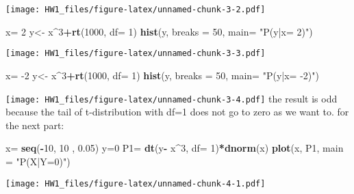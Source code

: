\documentclass[]{article}
\newenvironment{Shaded}{\begin{snugshade}}{\end{snugshade}}
\newcommand{\DataTypeTok}[1]{\textcolor[rgb]{0.13,0.29,0.53}{#1}}
\newcommand{\DecValTok}[1]{\textcolor[rgb]{0.00,0.00,0.81}{#1}}
\newcommand{\FloatTok}[1]{\textcolor[rgb]{0.00,0.00,0.81}{#1}}
\newcommand{\KeywordTok}[1]{\textcolor[rgb]{0.13,0.29,0.53}{\textbf{#1}}}
\newcommand{\NormalTok}[1]{#1}
\newcommand{\OperatorTok}[1]{\textcolor[rgb]{0.81,0.36,0.00}{\textbf{#1}}}
\newcommand{\StringTok}[1]{\textcolor[rgb]{0.31,0.60,0.02}{#1}}
\begin{document}
\texttt{[image: HW1\_files/figure-latex/unnamed-chunk-3-2.pdf]}

\begin{Shaded}
\begin{Highlighting}[]
\NormalTok{x=}\StringTok{ }\DecValTok{2}
\NormalTok{y<-}\StringTok{ }\NormalTok{x}\OperatorTok{^}\DecValTok{3}\OperatorTok{+}\KeywordTok{rt}\NormalTok{(}\DecValTok{1000}\NormalTok{, }\DataTypeTok{df=} \DecValTok{1}\NormalTok{)}
\KeywordTok{hist}\NormalTok{(y, }\DataTypeTok{breaks =}  \DecValTok{50}\NormalTok{, }\DataTypeTok{main=} \StringTok{"P(y|x= 2)"}\NormalTok{)}
\end{Highlighting}
\end{Shaded}

\texttt{[image: HW1\_files/figure-latex/unnamed-chunk-3-3.pdf]}

\begin{Shaded}
\begin{Highlighting}[]
\NormalTok{x=}\StringTok{ }\DecValTok{-2}
\NormalTok{y<-}\StringTok{ }\NormalTok{x}\OperatorTok{^}\DecValTok{3}\OperatorTok{+}\KeywordTok{rt}\NormalTok{(}\DecValTok{1000}\NormalTok{, }\DataTypeTok{df=} \DecValTok{1}\NormalTok{)}
\KeywordTok{hist}\NormalTok{(y, }\DataTypeTok{breaks =}  \DecValTok{50}\NormalTok{, }\DataTypeTok{main=} \StringTok{"P(y|x= -2)"}\NormalTok{)}
\end{Highlighting}
\end{Shaded}

\texttt{[image: HW1\_files/figure-latex/unnamed-chunk-3-4.pdf]} the
result is odd because the tail of t-distribution with df=1 does not go
to zero as we want to. for the next part:

\begin{Shaded}
\begin{Highlighting}[]
\NormalTok{x=}\StringTok{ }\KeywordTok{seq}\NormalTok{(}\OperatorTok{-}\DecValTok{10}\NormalTok{, }\DecValTok{10}\NormalTok{ , }\FloatTok{0.05}\NormalTok{)}
\NormalTok{y=}\DecValTok{0}
\NormalTok{P1=}\StringTok{ }\KeywordTok{dt}\NormalTok{(y}\OperatorTok{-}\StringTok{ }\NormalTok{x}\OperatorTok{^}\DecValTok{3}\NormalTok{, }\DataTypeTok{df=} \DecValTok{1}\NormalTok{)}\OperatorTok{*}\KeywordTok{dnorm}\NormalTok{(x)}
\KeywordTok{plot}\NormalTok{(x, P1, }\DataTypeTok{main =} \StringTok{"P(X|Y=0)"}\NormalTok{)}
\end{Highlighting}
\end{Shaded}

\texttt{[image: HW1\_files/figure-latex/unnamed-chunk-4-1.pdf]}
\end{document}
